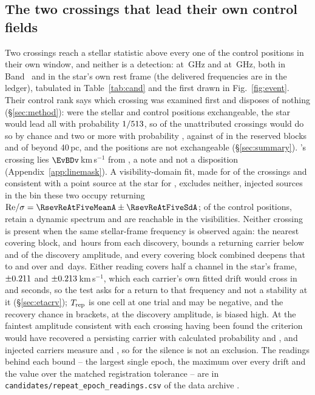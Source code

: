 \subsection{The two crossings that lead their own control fields}
\label{sec:vistest}

Two crossings reach a stellar statistic above every one of the \NCtrl{}
control positions in their own window, and neither is a detection: \EvAStar{}
at \RqFreqSx\,GHz and \EvBStar{} at \RqFreqCp\,GHz, both in Band~\EvABand{} and
in the star's own rest frame (the delivered frequencies are in the ledger),
tabulated in Table~\ref{tab:cand} and the first drawn in Fig.~\ref{fig:event}.
Their control rank says which crossing was examined first and disposes of
nothing (\S\ref{sec:method}): were the stellar and control positions
exchangeable, the star would lead all \NCtrl{} with probability $1/513$,
so \RkExpLead{} of the \RkNUnattr{} unattributed crossings would do so by chance
and two or more with probability \RkProbTwo, against
\RkHoLead{} of \RkHoN{} in the reserved blocks and \RkOosLead{} of \RkOosN{}
beyond 40\,pc, and the positions are not exchangeable (\S\ref{sec:summary}).
\EvBStar's crossing lies $\EvBDv$\,km\,s$^{-1}$ from \EvBLine, a note and not a
disposition (Appendix~\ref{app:linemask}). A visibility-domain fit, made for
\LgNFit{} of the \NCross{} crossings and consistent with a point source at the
star for \LgNLocalCor, excludes neither, injected sources in the bin these two
occupy returning ${\rm Re}/\sigma=\RsevReAtFiveMeanA\pm\RsevReAtFiveSdA$; of
the \NCtrl{} control positions, \RcNRetCtrl{} retain a dynamic spectrum and
\RcNVisCtrl{} are reachable in the visibilities. Neither crossing is present
when the same stellar-frame frequency is observed again: the nearest covering
block, \RcSxNearH{} and \EvBDeepH\,hours from each discovery, bounds a
returning carrier below \RqNearFracSx{} and \RqNearFracCp{} of the discovery
amplitude, and every covering block combined deepens that to \RcSxFive{} and
\RcCpFive{} over \RqSpanDSx{} and \RqSpanDCp\,days. Either reading covers half
a channel in the star's frame, $\pm0.211$ and $\pm0.213$\,km\,s$^{-1}$,
which each carrier's own fitted drift would cross in \ZtSxLeaveSec{} and
\ZtCpLeaveSec{} seconds, so the test asks for a return to that frequency and not
a stability at it (\S\ref{sec:etacrv}); $T_{\rm rep}$ is one cell at one trial
and may be negative, and the recovery chance in brackets, at the discovery
amplitude, is biased high. At the faintest amplitude consistent with each
crossing having been found the criterion would have recovered a persisting
carrier with calculated probability \RqPowerTrigSx{} and \RqPowerTrigCp, and
injected carriers measure \HjMeasSx{} and \HjMeasCp, so for \EvBStar{} the
silence is not an exclusion. The readings behind each bound -- the largest single epoch,
the maximum over every drift and the value over the matched registration
tolerance -- are in \texttt{candidates/repeat\_epoch\_readings.csv} of the data
archive \citep{SIdeposit}.


